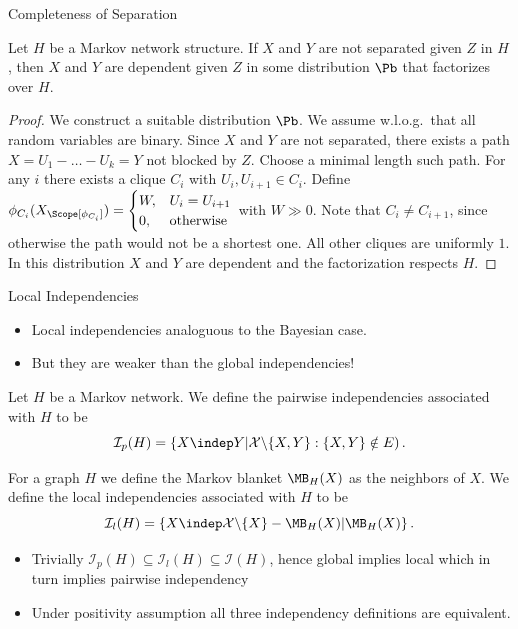 \begin{frame}{Completeness of Separation}
\begin{theorem}[Completeness]
Let $H$ be a Markov network structure.
If $X$ and $Y$ are not separated given $Z$ in $H$, then $X$ and $Y$ are dependent given $Z$ in some distribution $\Pb$ that factorizes over $H$.
\end{theorem}
\pause
\begin{proof}
We construct a suitable distribution $\Pb$.
We assume w.l.o.g.\ that all random variables are binary.
\pause
Since $X$ and $Y$ are not separated, there exists a path $X = U_1 - \dots - U_k = Y$ not blocked by $Z$. Choose a minimal length such path.
\pause 
For any $i$ there exists a clique $C_i$ with $U_i, U_{i+1} \in C_i$.
\pause
Define $\phi_{C_i}(X_{\Scope[\phi_{C_i}]}) = \begin{cases} W, & U_i = U_{i+1} \\ 0,& \text{otherwise} \end{cases}$ with $W \gg 0$.
\pause
Note that $C_i \neq C_{i+1}$, since otherwise the path would not be a shortest one.
\pause
All other cliques are uniformly $1$.
\pause
In this distribution $X$ and $Y$ are dependent and the factorization respects $H$.
\end{proof}
\end{frame}

\begin{frame}{Local Independencies}
    \begin{itemize}
    \item Local independencies analoguous to the Bayesian case.
    \item But they are weaker than the global independencies!
    \end{itemize}
    \pause
\begin{definition}
    Let $H$ be a Markov network.
    We define the pairwise independencies associated with $H$ to be
    \begin{equation}
    \mathcal{I}_p(H) = \{ X \indep Y | \mathcal{X} \backslash \{X,Y\} : \{X,Y\} \notin E)\,.
    \end{equation}
\end{definition}
    \pause
    \begin{definition}
        For a graph $H$ we define the Markov blanket $\MB_H(X)$ as the neighbors of $X$.
        We define the local independencies associated with $H$ to be
        \begin{equation}
        \mathcal{I}_l(H) = \{X \indep \mathcal{X} \backslash \{X\} - \MB_H(X) | \MB_H(X)\}\,.
        \end{equation}
    \end{definition}
    \begin{itemize}
    \item Trivially $\mathcal{I}_p(H) \subseteq \mathcal{I}_l(H) \subseteq \mathcal{I}(H)$, hence global implies local which in turn implies pairwise independency
    \item Under positivity assumption all three independency definitions are equivalent.
    \end{itemize}
\end{frame}

